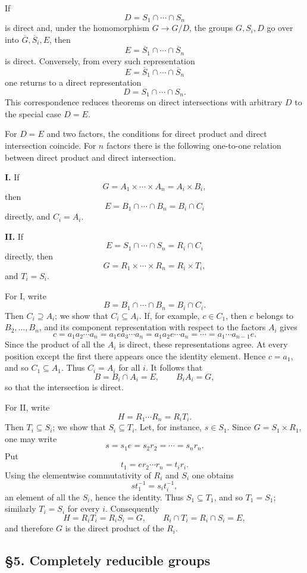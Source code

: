 \documentclass[11pt]{article}
\begin{document}
If \[
  D=S_1\cap\cdots\cap S_n
\] is direct and, under the homomorphism \(G\to G/D\), the groups
\(G,S_i,D\) go over into \(\overline G,\overline S_i,E\), then \[
  E=\overline S_1\cap\cdots\cap\overline S_n
\] is direct. Conversely, from every such representation \[
  E=\overline S_1\cap\cdots\cap\overline S_n
\] one returns to a direct representation \[
  D=S_1\cap\cdots\cap S_n.
\] This correspondence reduces theorems on direct intersections with
arbitrary \(D\) to the special case \(D=E\).

For \(D=E\) and two factors, the conditions for direct product and
direct intersection coincide. For \(n\) factors there is the following
one-to-one relation between direct product and direct intersection.

\textbf{I.} If \[
  G=A_1\times\cdots\times A_n=A_i\times B_i,
\] then \[
  E=B_1\cap\cdots\cap B_n=B_i\cap C_i
\] directly, and \(C_i=A_i\).

\textbf{II.} If \[
  E=S_1\cap\cdots\cap S_n=R_i\cap C_i
\] directly, then \[
  G=R_1\times\cdots\times R_n=R_i\times T_i,
\] and \(T_i=S_i\).

For I, write \[
  B=B_1\cap\cdots\cap B_n=B_i\cap C_i.
\] Then \(C_i\supseteq A_i\); we show that \(C_i\subseteq A_i\). If, for
example, \(c\in C_1\), then \(c\) belongs to \(B_2,\ldots,B_n\), and its
component representation with respect to the factors \(A_i\) gives \[
  c=a_1a_2\cdots a_n
   =a_1ea_3\cdots a_n
   =a_1a_2e\cdots a_n
   =\cdots=a_1\cdots a_{n-1}e.
\] Since the product of all the \(A_i\) is direct, these representations
agree. At every position except the first there appears once the
identity element. Hence \(c=a_1\), and so \(C_1\subseteq A_1\). Thus
\(C_i=A_i\) for all \(i\). It follows that \[
  B=B_i\cap A_i=E,
  \qquad B_iA_i=G,
\] so that the intersection is direct.

For II, write \[
  H=R_1\cdots R_n=R_iT_i.
\] Then \(T_i\subseteq S_i\); we show that \(S_i\subseteq T_i\). Let,
for instance, \(s\in S_1\). Since \(G=S_1\times R_1\), one may write \[
  s=s_1e=s_2r_2=\cdots=s_nr_n.
\] Put \[
  t_1=er_2\cdots r_n=t_ir_i.
\] Using the elementwise commutativity of \(R_i\) and \(S_i\) one
obtains \[
  s t_1^{-1}=s_it_i^{-1},
\] an element of all the \(S_i\), hence the identity. Thus
\(S_1\subseteq T_1\), and so \(T_1=S_1\); similarly \(T_i=S_i\) for
every \(i\). Consequently \[
  H=R_iT_i=R_iS_i=G,
  \qquad R_i\cap T_i=R_i\cap S_i=E,
\] and therefore \(G\) is the direct product of the \(R_i\).

\subsection{§5. Completely reducible
groups}\label{completely-reducible-groups}
\end{document}
